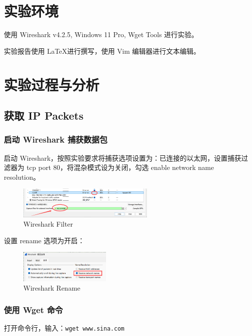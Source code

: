 \documentclass[14pt,a4paper,UTF8,twoside]{article}
\begin{document}
\section{实验环境}

使用 Wireshark v4.2.5, Windows 11 Pro, Wget Tools 进行实验。

实验报告使用 \LaTeX 进行撰写，使用 Vim 编辑器进行文本编辑。

\section{实验过程与分析}

\subsection{获取 IP Packets}

\subsubsection{启动 Wireshark 捕获数据包}

启动 Wireshark，按照实验要求将捕获选项设置为：已连接的以太网，设置捕获过滤器为 tcp port 80，将混杂模式设为关闭，勾选 enable network name resolution。

\begin{figure}[H]
  \centering
  \includegraphics[width=0.6\textwidth]{lab3/fitler.jpg}
  \caption{Wireshark Filter}
\end{figure}

设置 rename 选项为开启：

\begin{figure}[H]
  \centering
  \includegraphics[width=0.4\textwidth]{lab3/rename.png}
  \caption{Wireshark Rename}
\end{figure}

\subsubsection{使用 Wget 命令}

打开命令行，输入：\texttt{wget www.sina.com}
\end{document}
